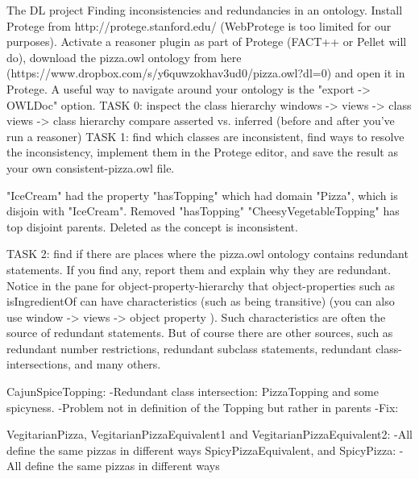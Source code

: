 The DL project
Finding inconsistencies and redundancies in an ontology.
Install Protege from http://protege.stanford.edu/ (WebProtege is too limited for our purposes). Activate a reasoner plugin as part of Protege (FACT++ or Pellet will do), download the pizza.owl ontology from here (https://www.dropbox.com/s/y6quwzokhav3ud0/pizza.owl?dl=0) and open it in Protege. A useful way to navigate around your ontology is the "export -> OWLDoc" option.
TASK 0: inspect the class hierarchy windows -> views -> class views -> class hierarchy compare asserted vs. inferred (before and after you've run a reasoner)
TASK 1: find which classes are inconsistent, find ways to resolve the inconsistency, implement them in the Protege editor, and save the result as your own consistent-pizza.owl file.

"IceCream" had the property "hasTopping" which had domain "Pizza", which is disjoin with "IceCream". Removed "hasTopping"
"CheesyVegetableTopping" has top disjoint parents. Deleted as the concept is inconsistent.

TASK 2: find if there are places where the pizza.owl ontology contains redundant statements. If you find any, report them and explain why they are redundant. Notice in the pane for object-property-hierarchy that object-properties such as isIngredientOf can have characteristics (such as being transitive) (you can also use window -> views -> object property ). Such characteristics are often the source of redundant statements. But of course there are other sources, such as redundant number restrictions, redundant subclass statements, redundant class-intersections, and many others.

CajunSpiceTopping:
-Redundant class intersection:
  PizzaTopping and some spicyness.
-Problem not in definition of the Topping but rather in parents
-Fix:

VegitarianPizza, VegitarianPizzaEquivalent1 and VegitarianPizzaEquivalent2:
-All define the same pizzas in different ways
SpicyPizzaEquivalent, and SpicyPizza:
-All define the same pizzas in different ways

